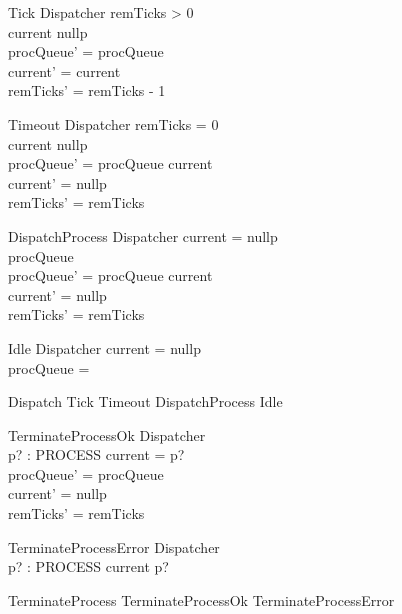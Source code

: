 \begin{schema}{Tick}
    \Delta Dispatcher
\where
    remTicks > 0 \\
    current \neq nullp \\
    procQueue' = procQueue \\
    current' = current \\
    remTicks' = remTicks - 1    
\end{schema}

\begin{schema}{Timeout}
    \Delta Dispatcher
\where
    remTicks = 0 \\
    current \neq nullp \\
    procQueue' = procQueue \cat \langle current \rangle \\
    current' = nullp \\
    remTicks' = remTicks 
\end{schema}

\begin{schema}{DispatchProcess}
    \Delta Dispatcher
\where
    current = nullp \\
    procQueue \neq \langle \rangle \\
    procQueue' = procQueue \cat \langle current \rangle \\
    current' = nullp \\
    remTicks' = remTicks 
\end{schema}

\begin{schema}{Idle}
    \Xi Dispatcher
\where
    current = nullp \\
    procQueue = \langle \rangle
\end{schema}

\begin{zed}
    Dispatch  Tick \lor Timeout \lor DispatchProcess \lor Idle
\end{zed}

\begin{schema}{TerminateProcessOk}
    \Delta Dispatcher \\
    p? : PROCESS
\where
    current = p? \\
    procQueue' = procQueue \\
    current' = nullp \\
    remTicks' = remTicks
\end{schema}

\begin{schema}{TerminateProcessError}
    \Xi Dispatcher \\
    p? : PROCESS
\where
    current \neq p?
\end{schema}

\begin{zed}
    TerminateProcess  TerminateProcessOk \lor TerminateProcessError
\end{zed}
